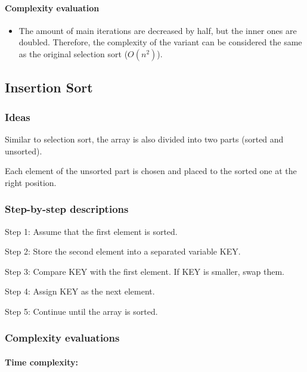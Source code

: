 \documentclass{article}
\newcommand\tab[1][0.5cm]{\hspace*{#1}}
\begin{document}
\paragraph{\tab Complexity evaluation}

\begin{itemize}
    \item The amount of main iterations are decreased by half, but the inner ones are doubled. Therefore, the complexity of the variant can be considered the same as the original selection sort ($O(n^2)$).
\end{itemize}

\pagebreak


\subsection{Insertion Sort}

\bigskip

\subsubsection{Ideas}

\tab Similar to selection sort, the array is also
divided into two parts (sorted and unsorted).
\smallskip

Each element of the unsorted part is chosen and placed to the sorted one at the right position.

\subsubsection{Step-by-step descriptions}

\tab Step 1: Assume that the first element is sorted.
\smallskip

Step 2: Store the second element into a separated variable KEY.
\smallskip

Step 3: Compare KEY with the first element. If KEY is smaller, swap them.
\smallskip

Step 4: Assign KEY as the next element.
\smallskip

Step 5: Continue until the array is sorted.

\subsubsection{Complexity evaluations}

\paragraph{\tab Time complexity:}
\end{document}
